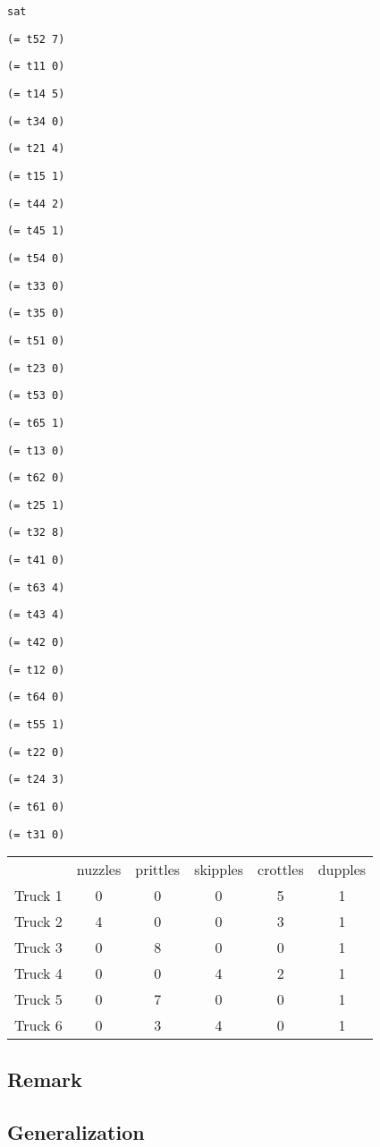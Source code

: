 \documentclass[11pt]{article}
\begin{document}
{\footnotesize

{\tt sat}

{\tt (= t52 7)}

{\tt (= t11 0)}

{\tt (= t14 5)}

{\tt (= t34 0)}

{\tt (= t21 4)}

{\tt (= t15 1)}

{\tt (= t44 2)}

{\tt (= t45 1)}

{\tt (= t54 0)}

{\tt (= t33 0)}

{\tt (= t35 0)}

{\tt (= t51 0)}

{\tt (= t23 0)}

{\tt (= t53 0)}

{\tt (= t65 1)}

{\tt (= t13 0)}

{\tt (= t62 0)}

{\tt (= t25 1)}

{\tt (= t32 8)}

{\tt (= t41 0)}

{\tt (= t63 4)}

{\tt (= t43 4)}

{\tt (= t42 0)}

{\tt (= t12 0)}

{\tt (= t64 0)}

{\tt (= t55 1)}

{\tt (= t22 0)}

{\tt (= t24 3)}

{\tt (= t61 0)}

{\tt (= t31 0)}

}

\begin{table}
  \centering
  \begin{tabular}{|l|c|c|c|c|c|}
    \hline
     & nuzzles & prittles & skipples & crottles & dupples \\
    Truck 1 & 0 & 0 & 0 & 5 & 1 \\
    Truck 2 & 4 & 0 & 0 & 3 & 1 \\
    Truck 3 & 0 & 8 & 0 & 0 & 1 \\
    Truck 4 & 0 & 0 & 4 & 2 & 1 \\
    Truck 5 & 0 & 7 & 0 & 0 & 1 \\
    Truck 6 & 0 & 3 & 4 & 0 & 1 \\
    \hline
  \end{tabular}
\end{table}


\subsection*{Remark}


\subsection*{Generalization}






\end{document}
